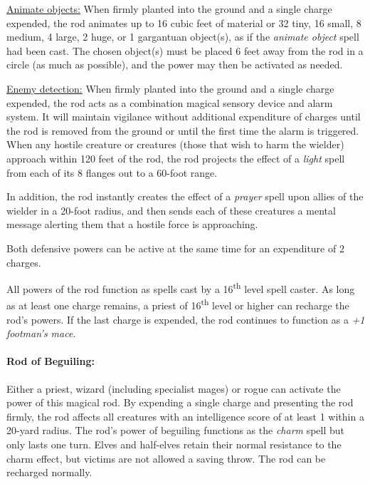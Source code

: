 \begin{multicols}{2}
\underline{Animate objects:} When firmly planted into the ground and a single charge expended, the rod animates up to 16 cubic feet of material or 32 tiny, 16 small, 8 medium, 4 large, 2 huge, or 1 gargantuan object(s), as if the \textit{animate object} spell had been cast.  The chosen object(s) must be placed 6 feet away from the rod in a circle (as much as possible), and the power may then be activated as needed.  

\underline{Enemy detection:} When firmly planted into the ground and a single charge expended, the rod acts as a combination magical sensory device and alarm system.  It will maintain vigilance without additional expenditure of charges until the rod is removed from the ground or until the first time the alarm is triggered.  When any hostile creature or creatures (those that wish to harm the wielder) approach within 120 feet of the rod, the rod projects the effect of a \textit{light} spell from each of its 8 flanges out to a 60-foot range.  

In addition, the rod instantly creates the effect of a \textit{prayer} spell upon allies of the wielder in a 20-foot radius, and then sends each of these creatures a mental message alerting them that a hostile force is approaching.

Both defensive powers can be active at the same time for an expenditure of 2 charges.

All powers of the rod function as spells cast by a 16\textsuperscript{th} level spell caster.  As long as at least one charge remains, a priest of 16\textsuperscript{th} level or higher can recharge the rod's powers.  If the last charge is expended, the rod continues to function as a \textit{+1 footman's mace}.

\paragraph{Rod of Beguiling:} Either a priest, wizard (including specialist mages) or rogue can activate the power of this magical rod.  By expending a single charge and presenting the rod firmly, the rod affects all creatures with an intelligence score of at least 1 within a 20-yard radius.  The rod's power of beguiling functions as the \textit{charm} spell but only lasts one turn.  Elves and half-elves retain their normal resistance to the charm effect, but victims are not allowed a saving throw.  The rod can be recharged normally.


\end{multicols}
